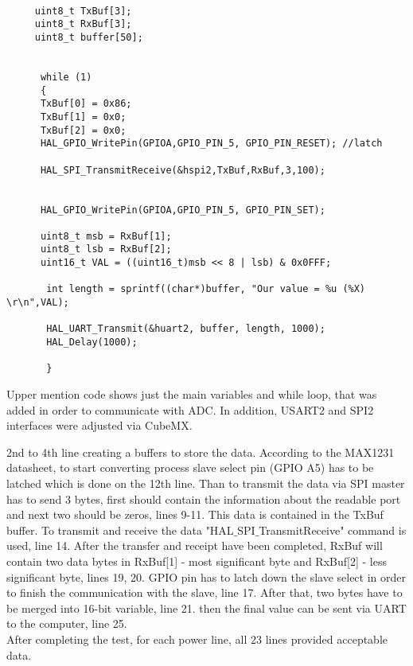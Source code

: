 	
	 \begin{lstlisting}

	 uint8_t TxBuf[3];
	 uint8_t RxBuf[3];
	 uint8_t buffer[50];
	

	  while (1)
	  {
	  TxBuf[0] = 0x86;
	  TxBuf[1] = 0x0;
	  TxBuf[2] = 0x0;
	  HAL_GPIO_WritePin(GPIOA,GPIO_PIN_5, GPIO_PIN_RESET); //latch 
	  
	  HAL_SPI_TransmitReceive(&hspi2,TxBuf,RxBuf,3,100);
	  
	  
	  HAL_GPIO_WritePin(GPIOA,GPIO_PIN_5, GPIO_PIN_SET);
	  
	  uint8_t msb = RxBuf[1];
	  uint8_t lsb = RxBuf[2];
	  uint16_t VAL = ((uint16_t)msb << 8 | lsb) & 0x0FFF;
	  
	   int length = sprintf((char*)buffer, "Our value = %u (%X) \r\n",VAL);
	   
	   HAL_UART_Transmit(&huart2, buffer, length, 1000);
	   HAL_Delay(1000);
	   
	   }
	 \end{lstlisting}
	 
	 Upper mention code shows just the main variables and while loop, that was added in order to communicate with ADC. In addition, USART2 and SPI2 interfaces were adjusted via CubeMX.
	 
	 2nd to 4th line creating a buffers to store the data. According to the MAX1231 datasheet, to start converting process slave select pin (GPIO A5) has to be latched which is done on the 12th line.
	 Than to transmit the data via SPI master has to send 3 bytes, first should contain the information about the readable port and next two should be zeros, lines 9-11. This data is contained in the TxBuf buffer. To transmit and receive the data "HAL$\_$SPI$\_$TransmitReceive" command is used, line 14. After the transfer and receipt have been completed, RxBuf will contain two data bytes in RxBuf[1] - most significant byte and RxBuf[2] - less significant byte, lines 19, 20. GPIO pin has to latch down the slave select in order to finish the communication with the slave, line 17. After that, two bytes have to be merged into 16-bit variable, line 21. then the final value can be sent via UART to the computer, line 25.\\
	 After completing the test, for each power line, all 23 lines provided acceptable data.
	 
	 
		